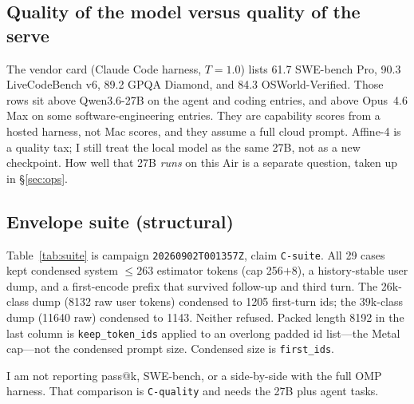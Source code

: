 \subsection{Quality of the model versus quality of the serve}

The vendor card (Claude Code harness, $T{=}1.0$) lists 61.7 SWE-bench Pro, 90.3 LiveCodeBench v6, 89.2 GPQA Diamond, and 84.3 OSWorld-Verified. Those rows sit above Qwen3.6-27B on the agent and coding entries, and above Opus~4.6 Max on some software-engineering entries. They are capability scores from a hosted harness, not Mac scores, and they assume a full cloud prompt. Affine-4 is a quality tax; I still treat the local model as the same 27B, not as a new checkpoint. How well that 27B \emph{runs} on this Air is a separate question, taken up in \S\ref{sec:ops}.

\subsection{Envelope suite (structural)}
\label{sec:suite}

Table~\ref{tab:suite} is campaign \texttt{20260902T001357Z}, claim \texttt{C-suite}. All 29 cases kept condensed system $\le 263$ estimator tokens (cap 256${+}8$), a history-stable user dump, and a first-encode prefix that survived follow-up and third turn. The 26k-class dump (8132 raw user tokens) condensed to 1205 first-turn ids; the 39k-class dump (11640 raw) condensed to 1143. Neither refused. Packed length 8192 in the last column is \texttt{keep\_token\_ids} applied to an overlong padded id list---the Metal cap---not the condensed prompt size. Condensed size is \texttt{first\_ids}.

I am not reporting pass@k, SWE-bench, or a side-by-side with the full OMP harness. That comparison is \texttt{C-quality} and needs the 27B plus agent tasks.

